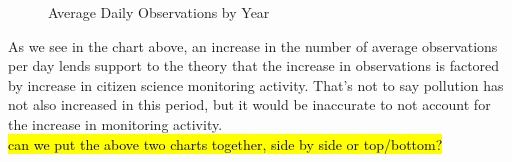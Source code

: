\documentclass[10pt]{article}\usepackage[]{graphicx}\usepackage[]{color}
\newenvironment{knitrout}{}{} %
\begin{document}
\begin{figure}[H]
\begin{center}
\begin{knitrout}
\end{knitrout}
\caption {Average Daily Observations by Year}
\label{figD1}
\end {center}
\end {figure}

As we see in the chart above, an increase in the number of average observations per day lends support to the theory that the increase in observations is factored by increase in citizen science monitoring activity. That's not to say pollution has not also increased in this period, but it would be inaccurate to not account for the increase in monitoring activity.\\

\hl{can we put the above two charts together, side by side or top/bottom?}\\
\end{document}

